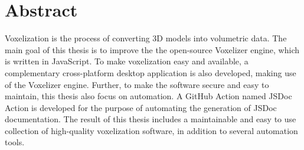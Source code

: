 \section*{Abstract}
Voxelization is the process of converting 3D models into volumetric data. The main goal of this thesis is to improve the the open-source Voxelizer engine, which is written in JavaScript. To make voxelization easy and available, a complementary cross-platform desktop application is also developed, making use of the Voxelizer engine. Further, to make the software secure and easy to maintain, this thesis also focus on automation. A GitHub Action named JSDoc Action is developed for the purpose of automating the generation of JSDoc documentation. The result of this thesis includes a maintainable and easy to use collection of high-quality voxelization software, in addition to several automation tools.

